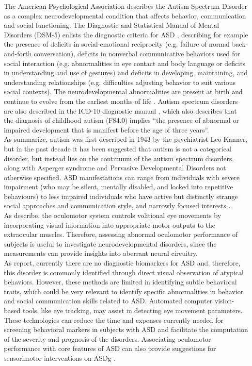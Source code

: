 The American Psychological Association \citep{apa2017diagnosis} describes the Autism Spectrum Disorder as a complex neurodevelopmental condition that affects behavior, communication and social functioning. The Diagnostic and Statistical Manual of Mental Disorders (DSM-5) enlists the diagnostic criteria for ASD \citep{apa2013dsm5}, describing for example the presence of deficits in social-emotional reciprocity (e.g. failure of normal back-and-forth conversation), deficits in nonverbal communicative behaviors used for social interaction (e.g. abnormalities in eye contact and body language or deficits in understanding and use of gestures) and deficits in developing, maintaining, and understanding relationships (e.g. difficulties adjusting behavior to suit various social contexts). The neurodevelopmental abnormalities are present at birth and continue to evolve from the earliest months of life \citep{zwaigenbaum2005behaviorchildren}. Autism spectrum disorders are also described in the ICD-10 diagnostic manual \citep{who2016ICD10}, which also describes that the diagnosis of childhood autism (F84.0) implies “the presence of abnormal or impaired development that is manifest before the age of three years”. \\
As \cite{boraston2007eyetrackingASD} summarize, autism was first described in 1943 by the psychiatrist Leo Kanner, but in the past decade it has been suggested that autism is not a categorical disorder, but instead lies on the continuum of the autism spectrum disorders, along with Asperger syndrome and Pervasive Developmental Disorders not otherwise specified.
ASD manifestations can range from individuals with severe impairment (who may be silent, mentally disabled, and locked into repetitive behaviours) to less impaired individuals who have active but distinctly strange social approaches and communication style, and narrowly focused interests \citep{pensiero2009saccades}.\\
As \cite{wilkes2015oculomotor} describe, the oculomotor system controls volitional eye movements by incorporating visual information into appropriate motor outputs to the extraocular muscles. Therefore, assessing abnormal oculomotor performance of subjects is useful to investigate neurodevelopmental disorders, since the measurements can provide insights into aberrant neural circuitry.\\
As \cite{samad2017markers} report, currently there are no diagnostic biomarkers for ASD and, therefore, this disorder is commonly identified through direct visual observation of atypical behaviors. However,  these methods are limited in identifying subtle behavioral traits, which could be very relevant to identify specific abnormalities in behavior and social communication skills related to ASD. Automated computer vision-based tools, like eye tracking, may assist in detecting eye movement parameters. These technologies can reduce the time and expenses currently needed for screening behavioral markers in subjects with ASD and facilitate the computation of the severity and prognosis of the disorders. Associating oculomotor performance with core features of ASD can also provide suggestions for sensorimotor interventions on ASDg \citep{wilkes2015oculomotor}.\\

